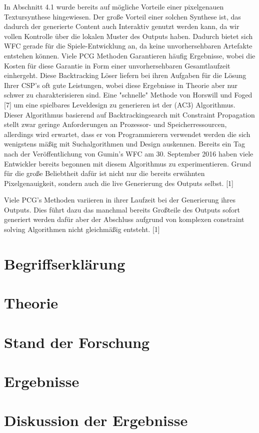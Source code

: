 \documentclass[12pt]{report}
\begin{document}
In Abschnitt 4.1 wurde bereits auf mögliche Vorteile einer pixelgenauen Textursynthese hingewiesen.
Der große Vorteil einer solchen Synthese ist, das dadurch der generierte Content auch Interaktiv genutzt werden kann, da wir vollen Kontrolle über die lokalen Muster des Outputs haben.
Dadurch bietet sich WFC gerade für die Spiele-Entwicklung an, da keine unvorhersehbaren Artefakte entstehen können.
Viele PCG Methoden Garantieren häufig Ergebnisse, wobei die Kosten für diese Garantie in Form einer unvorhersehbaren Gesamtlaufzeit einhergeht.
Diese Backtracking Löser liefern bei ihren Aufgaben für die Lösung Ihrer CSP's oft gute Leistungen, wobei diese Ergebnisse in Theorie aber nur schwer zu charakterisieren sind.
Eine "schnelle" Methode von Horswill und Foged [7] um eine spielbares Leveldesign zu generieren ist der {(AC3)} Algorithmus.
Dieser Algorithmus basierend auf Backtrackingsearch mit Constraint Propagation stellt zwar geringe Anforderungen an Prozessor- und Speicherressourcen,
allerdings wird erwartet, dass er von Programmierern verwendet werden die sich wenigstens mäßig mit Suchalgorithmen und Design auskennen.
Bereits ein Tag nach der Veröffentlichung von Gumin's WFC am 30. September 2016 haben viele Entwickler bereits begonnen mit diesem Algorithmus zu experimentieren.
Grund für die große Beliebtheit dafür ist nicht nur die bereits erwähnten Pixelgenauigkeit, sondern auch die live Generierung des Outputs selbst. {[1]}

Viele PCG's Methoden variieren in ihrer Laufzeit bei der Generierung ihres Outputs.
Dies führt dazu das manchmal bereits Großteile des Outputs sofort generiert werden dafür aber der Abschluss aufgrund von komplexen constraint solving Algorithmen nicht gleichmäßig entsteht. {[1]}



{\let\clearpage\relax\chapter{Begriffserklärung}}

{\let\clearpage\relax\chapter{Theorie}}
{\let\clearpage\relax\chapter{Stand der Forschung}}
{\let\clearpage\relax\chapter{Ergebnisse}}
{\let\clearpage\relax\chapter{Diskussion der Ergebnisse}}
\end{document}

